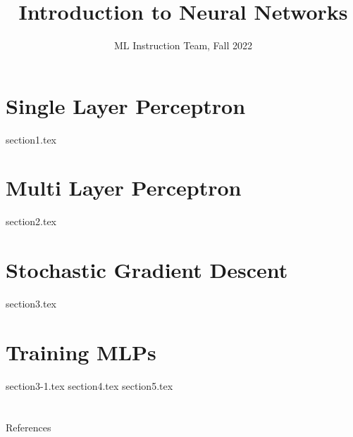 \documentclass[compress,oilve]{beamer}
\title{Introduction to Neural Networks}
\author{ML Instruction Team, Fall 2022}
\institute[]{CE Department \newline  Sharif University of Technology}
\date[\today]{}
\begin{document}
	
	\fontsize{9}{9}
	\begin{frame}
		\titlepage
	\end{frame}
	
	\section{Single Layer Perceptron}
	{section1.tex}
	\section{Multi Layer Perceptron}
	{section2.tex}
	\section{Stochastic Gradient Descent}
	{section3.tex}
	\section{Training MLPs}
	{section3-1.tex}
	{section4.tex}
	{section5.tex}
	
	
	\section{}
	
	
	\begin{frame}{References}
		
	\end{frame}
\end{document}
